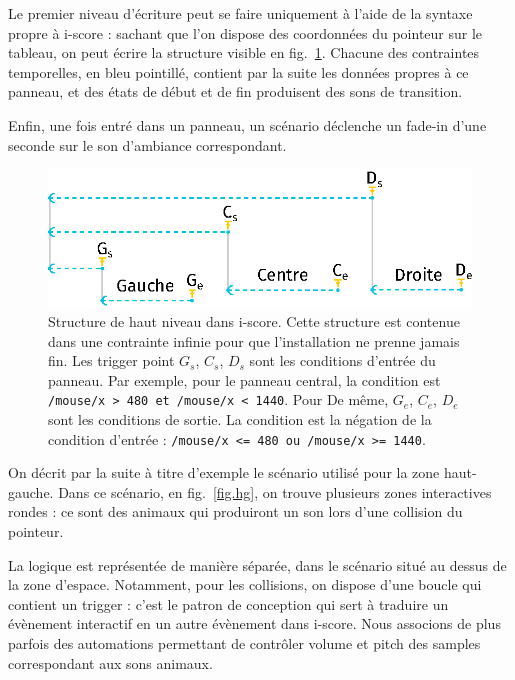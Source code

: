 \documentclass[french]{article}
\begin{document}
    
    Le premier niveau d'écriture peut se faire uniquement à l'aide de la syntaxe propre à i-score : 
    sachant que l'on dispose des coordonnées du pointeur sur le tableau, on peut écrire la structure visible en fig.~\ref{fig.1stlevel}.
    Chacune des contraintes temporelles, en bleu pointillé, contient par la suite les données propres à ce panneau, et des états de début et de fin produisent des sons de transition.
    
    Enfin, une fois entré dans un panneau, un scénario déclenche un fade-in d'une seconde sur le son d'ambiance correspondant.
    
    \begin{figure}[h]
        \centering
        \includegraphics{images/1stcase.eps}
        \caption{Structure de haut niveau dans i-score. Cette structure est contenue dans une contrainte infinie pour que l'installation ne prenne jamais fin. Les trigger point $G_s$, $C_s$, $D_s$ sont les conditions d'entrée du panneau. Par exemple, pour le panneau central, la condition est \lstinline{/mouse/x > 480 et /mouse/x < 1440}. Pour De même, $G_e$, $C_e$, $D_e$ sont les conditions de sortie. La condition est la négation de la condition d'entrée : \lstinline{/mouse/x <= 480 ou /mouse/x >= 1440}.}
        \label{fig.1stlevel}
    \end{figure}
    
    On décrit par la suite à titre d'exemple le scénario utilisé pour la zone haut-gauche.
    Dans ce scénario, en fig.~\ref{fig.hg}, on trouve plusieurs zones interactives rondes : ce sont des animaux qui produiront un son lors d'une collision du pointeur.
    
    La logique est représentée de manière séparée, dans le scénario situé au dessus de la zone d'espace.
    Notamment, pour les collisions, on dispose d'une boucle qui contient un trigger : c'est le patron de conception qui sert à traduire un évènement interactif en un autre évènement dans i-score. Nous associons de plus parfois des automations permettant de contrôler volume et pitch des samples correspondant aux sons animaux.
    
\end{document}
